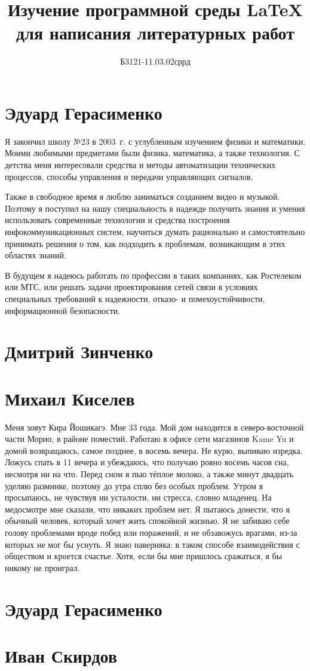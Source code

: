 \documentclass[labwork]{fefudoc}
\author{Б3121-11.03.02сррд}{Дмитрий Зинченко}
\title{Изучение программной среды \LaTeX{} для написания литературных работ}
\begin{document}
\frontpage
\tableofcontents

\section{Эдуард Герасименко}
Я закончил школу №23 в 2003~г. с углубленным изучением физики и математики. Моими любимыми предметами были физика, математика, а также технология. С детства меня интересовали средства и методы автоматизации технических процессов, способы управления и передачи управляющих сигналов.

Также в свободное время я люблю заниматься созданием видео и музыкой. Поэтому я поступил на нашу специальность в надежде получить знания и умения использовать современные технологии и средства построения инфокоммуникационных систем, научиться думать рационально и самостоятельно принимать решения о том, как подходить к проблемам, возникающим в этих областях знаний.

В будущем я надеюсь работать по профессии в таких компаниях, как Ростелеком или МТС, или решать задачи проектирования сетей связи в условиях специальных требований к надежности, отказо- и помехоустойчивости, информационной безопасности.

\section{Дмитрий Зинченко}
\section{Михаил Киселев}
Меня зовут Кира Йошикагэ. Мне 33 года. Мой дом находится в северо-восточной части Морио, в районе поместий. Работаю в офисе сети магазинов Kame Yu и домой возвращаюсь, самое позднее, в восемь вечера.
Не курю, выпиваю изредка. Ложусь спать в 11 вечера и убеждаюсь, что получаю ровно восемь часов сна, несмотря ни на что. Перед сном я пью тёплое молоко, а также минут двадцать уделяю разминке, поэтому до утра сплю без особых проблем.
Утром я просыпаюсь, не чувствуя ни усталости, ни стресса, словно младенец. На медосмотре мне сказали, что никаких проблем нет. Я пытаюсь донести, что я обычный человек, который хочет жить спокойной жизнью. Я не забиваю себе голову проблемами вроде побед или поражений, и не обзавожусь врагами, из-за которых не мог бы уснуть. 
Я знаю наверняка: в таком способе взаимодействия с обществом и кроется счастье. Хотя, если бы мне пришлось сражаться, я бы никому не проиграл.

\section{Эдуард Герасименко}
\section{Иван Скирдов}
\end{document}
